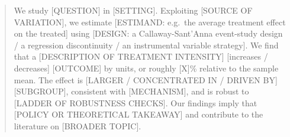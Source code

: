 
\begin{abstract}
We study [QUESTION] in [SETTING].
%
Exploiting [SOURCE OF VARIATION], we estimate [ESTIMAND: e.g.\ the
average treatment effect on the treated] using [DESIGN: a Callaway-Sant'Anna
event-study design / a regression discontinuity / an instrumental
variable strategy].
%
We find that a [DESCRIPTION OF TREATMENT INTENSITY] [increases / decreases]
[OUTCOME] by \headlineEstimate{} units, or roughly [X]\% relative to the
sample mean.
%
The effect is [LARGER / CONCENTRATED IN / DRIVEN BY] [SUBGROUP],
consistent with [MECHANISM], and is robust to [LADDER OF ROBUSTNESS
CHECKS].
%
Our findings imply that [POLICY OR THEORETICAL TAKEAWAY] and contribute to
the literature on [BROADER TOPIC].
\end{abstract}

